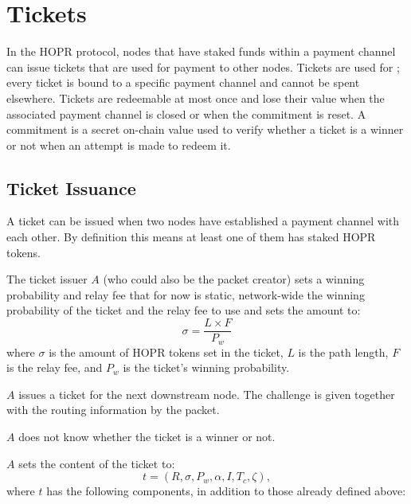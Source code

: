 \section{Tickets}
\label{sec:tickets}

In the HOPR protocol, nodes that have staked funds within a payment channel can issue tickets that are used for payment to other nodes. Tickets are used for ; every ticket is bound to a specific payment channel and cannot be spent elsewhere. Tickets are redeemable at most once and lose their value when the associated payment channel is closed or when the commitment is reset. A commitment is a secret on-chain value used to verify whether a ticket is a winner or not when an attempt is made to redeem it.

\subsection{Ticket Issuance}

A ticket can be issued when two nodes have established a payment channel with each other. By definition this means at least one of them has staked HOPR tokens.

The ticket issuer $A$ (who could also be the packet creator) sets a winning probability and relay fee that for now is static, network-wide the winning probability of the ticket and the relay fee to use and sets the amount to: $$\sigma=\dfrac{L\times F}{P_w}$$ where $\sigma$ is the amount of HOPR tokens set in the ticket, $L$ is the path length, $F$ is the relay fee, and $P_w$ is the ticket's winning probability.

$A$ issues a ticket for the next downstream node. The challenge is given together with the routing information by the packet.

$A$ does not know whether the ticket is a winner or not.

$A$ sets the content of the ticket to: $$t=(R,\sigma,P_w,\alpha,I,T_c,\zeta),$$ where $t$ has the following components, in addition to those already defined above:

